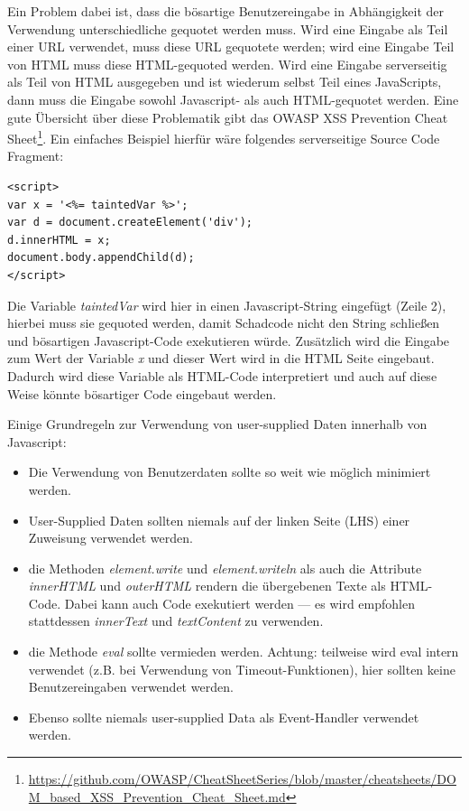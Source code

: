 Ein Problem dabei ist, dass die bösartige Benutzereingabe in Abhängigkeit der Verwendung unterschiedliche gequotet werden muss. Wird eine Eingabe als Teil einer URL verwendet, muss diese URL gequotete werden; wird eine Eingabe Teil von HTML muss diese HTML-gequoted werden. Wird eine Eingabe serverseitig als Teil von HTML ausgegeben und ist wiederum selbst Teil eines JavaScripts, dann muss die Eingabe sowohl Javascript- als auch HTML-gequotet werden. Eine gute Übersicht über diese Problematik gibt das OWASP XSS Prevention Cheat Sheet\footnote{\url{https://github.com/OWASP/CheatSheetSeries/blob/master/cheatsheets/DOM_based_XSS_Prevention_Cheat_Sheet.md}}. Ein einfaches Beispiel hierfür wäre folgendes serverseitige Source Code Fragment:

\begin{verbatim}
<script>
var x = '<%= taintedVar %>';
var d = document.createElement('div');
d.innerHTML = x;
document.body.appendChild(d);
</script>
\end{verbatim}

Die Variable \textit{taintedVar} wird hier in einen Javascript-String eingefügt (Zeile 2), hierbei muss sie gequoted werden, damit Schadcode nicht den String schließen und bösartigen Javascript-Code exekutieren würde. Zusätzlich wird die Eingabe zum Wert der Variable \textit{x} und dieser Wert wird in die HTML Seite eingebaut. Dadurch wird diese Variable als HTML-Code interpretiert und auch auf diese Weise könnte bösartiger Code eingebaut werden.

Einige Grundregeln zur Verwendung von user-supplied Daten innerhalb von Javascript:

\begin{itemize}
\item Die Verwendung von Benutzerdaten sollte so weit wie möglich minimiert werden.
\item User-Supplied Daten sollten niemals auf der linken Seite (LHS) einer Zuweisung verwendet werden.
\item die Methoden \textit{element.write} und \textit{element.writeln} als auch die Attribute \textit{innerHTML} und \textit{outerHTML} rendern die übergebenen Texte als HTML-Code. Dabei kann auch Code exekutiert werden --- es wird empfohlen stattdessen \textit{innerText} und \textit{textContent} zu verwenden.
\item die Methode \textit{eval} sollte vermieden werden. Achtung: teilweise wird eval intern verwendet (z.B. bei Verwendung von Timeout-Funktionen), hier sollten keine Benutzereingaben verwendet werden.
\item Ebenso sollte niemals user-supplied Data als Event-Handler verwendet werden.
\end{itemize}

